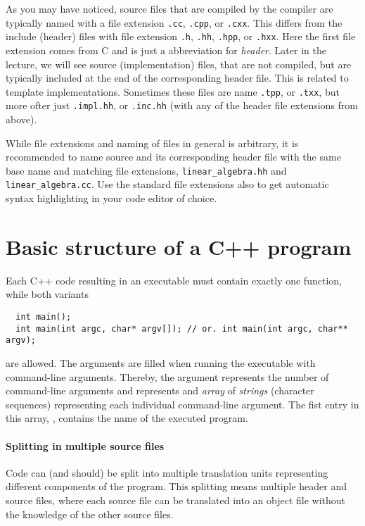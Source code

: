 \begin{rem}
  As you may have noticed, source files that are compiled by the compiler are typically named with a file extension \texttt{.cc}, \texttt{.cpp}, or \texttt{.cxx}. This differs from the include (header) files with file extension \texttt{.h}, \texttt{.hh}, \texttt{.hpp}, or \texttt{.hxx}.  Here the first file extension comes from C and is just a abbreviation for \textit{header}. Later in the lecture, we will see source (implementation) files, that are not compiled, but are typically included at the end of the corresponding header file. This is related to template   implementations. Sometimes these files are name \texttt{.tpp}, or \texttt{.txx}, but more ofter just \texttt{.impl.hh}, or \texttt{.inc.hh} (with any of the header file extensions from above).

  While file extensions and naming of files in general is arbitrary, it is recommended to name source and its corresponding header file with the same base name and matching file extensions, \eg \texttt{linear\_algebra.hh} and \texttt{linear\_algebra.cc}. Use the standard file extensions also to get automatic syntax highlighting in your code editor of choice.
\end{rem}


\section{Basic structure of a C++ program\label{sec:code-structure}}
Each C++ code resulting in an executable must contain exactly one  function, while both variants
%
\begin{verbatim}
  int main();
  int main(int argc, char* argv[]); // or. int main(int argc, char** argv);
\end{verbatim}
%
are allowed. The arguments  are filled when running the executable with command-line arguments. Thereby, the argument  represents the number of command-line arguments and  represents and \textit{array} of \textit{strings} (character sequences) representing each individual command-line argument. The fist entry in this array, , contains the name of the executed program.

\paragraph{Splitting in multiple source files}
Code can (and should) be split into multiple translation units representing different components of the program. This splitting means multiple header and source files, where each source file can be translated into an object file without the knowledge of the other source files.

